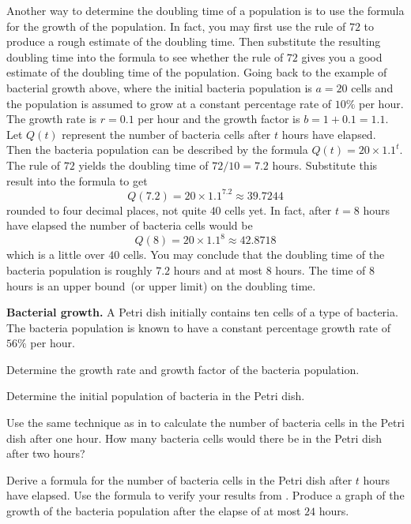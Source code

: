 \documentclass[a4paper,oneside,12pt]{article}
\begin{document}
Another way to determine the doubling time of a population is to use
the formula for the growth of the population.  In fact, you may first
use the rule of $72$ to produce a rough estimate of the doubling
time.  Then substitute the resulting doubling time into the formula to
see whether the rule of $72$ gives you a good estimate of the doubling
time of the population.  Going back to the example of bacterial growth
above, where the initial bacteria population is $a = 20$ cells and the
population is assumed to grow at a constant percentage rate of $10\%$
per hour.  The growth rate is $r = 0.1$ per hour and the growth factor
is $b = 1 + 0.1 = 1.1$.  Let $Q(t)$ represent the number of bacteria
cells after $t$ hours have elapsed.  Then the bacteria population can
be described by the formula $Q(t) = 20 \times 1.1^t$.  The rule of
$72$ yields the doubling time of $72 / 10 = 7.2$ hours.  Substitute
this result into the formula to get
\[
Q(7.2)
=
20 \times 1.1^{7.2}
\approx
39.7244
\]
rounded to four decimal places, not quite $40$ cells yet.  In fact,
after $t = 8$ hours have elapsed the number of bacteria cells would be
\[
Q(8)
=
20 \times 1.1^8
\approx
42.8718
\]
which is a little over $40$ cells.  You may conclude that the doubling
time of the bacteria population is roughly $7.2$ hours and at most $8$
hours.  The time of $8$ hours is an upper bound~(or upper limit) on
the doubling time.

\begin{example}
\label{eg:exponential:bacterial_growth}
\textbf{Bacterial growth.}
A Petri dish initially contains ten cells of a type of bacteria.  The
bacteria population is known to have a constant percentage growth rate
of $56\%$ per hour.
\begin{packedenum}
\item\label{subeg:exponential:bacteria_growth_rate}
  Determine the growth rate and growth factor of the bacteria
  population.

\item\label{subeg:exponential:bacteria_initial_population}
  Determine the initial population of bacteria in the Petri dish.

\item\label{subeg:exponential:bacteria_growth_1_2_hours}
  Use the same technique as in
  to calculate the number of bacteria cells in the Petri dish after
  one hour.  How many bacteria cells would there be in the Petri dish
  after two hours?

\item\label{subeg:exponential:bacteria_growth_formula}
  Derive a formula for the number of bacteria cells in the Petri dish
  after $t$ hours have elapsed.  Use the formula to verify your
  results from .  Produce a
  graph of the growth of the bacteria population after the elapse of
  at most $24$ hours.
\end{packedenum}
\end{example}
\end{document}
